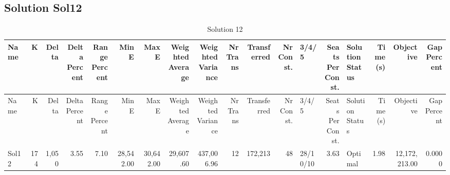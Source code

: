 \documentclass[a4paper]{article}
\begin{document}
\clearpage
\subsection{Solution Sol12}

{\scriptsize
\begin{longtable}{lrrrrrrrrrrrlrlrrr}
\caption{Solution 12}
\\ \toprule
Name &K &Delta &\shortstack{Delta\\Percent} &\shortstack{Range\\Percent} &Min E &Max E &\shortstack{Weighted\\Average} &\shortstack{Weighted\\Variance} &\shortstack{Nr\\Trans} &Transferred &\shortstack{Nr\\Const.} &3/4/5 &\shortstack{Seats\\Per\\Const.} &\shortstack{Solution\\Status} &\shortstack{Time\\(s)} &Objective &\shortstack{Gap\\Percent} \\ \midrule
\endfirsthead
\toprule
Name &K &Delta &\shortstack{Delta\\Percent} &\shortstack{Range\\Percent} &Min E &Max E &\shortstack{Weighted\\Average} &\shortstack{Weighted\\Variance} &\shortstack{Nr\\Trans} &Transferred &\shortstack{Nr\\Const.} &3/4/5 &\shortstack{Seats\\Per\\Const.} &\shortstack{Solution\\Status} &\shortstack{Time\\(s)} &Objective &\shortstack{Gap\\Percent} \\ \midrule
\endhead
\bottomrule
\endfoot
Sol12&174&1,050& 3.55& 7.10&28,542.00&30,642.00&29,607.60&437,006.96&12&172,213&48&28/10/10& 3.63&Optimal& 1.98&12,172,213.00&0.0000\\ 
\end{longtable}

}
\end{document}
